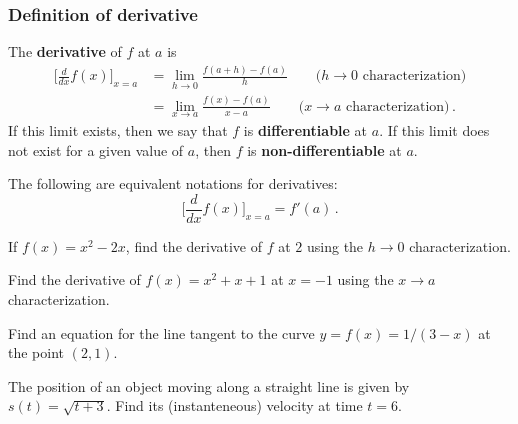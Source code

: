\documentclass[10pt,t,presentation,ignorenonframetext,aspectratio=169]{beamer}
\begin{document}
\begin{frame}
  \frametitle{Definition of derivative}
  \begin{defn}
    The \textbf{derivative} of $f$ at $a$ is
    \begin{align*}
      \biggl[ \frac{d}{dx} f(x) \biggr]_{x=a}
      & = \lim_{h\to 0} \frac{f(a+h) - f(a)}{h}
        \qquad \text{($h \to 0$ characterization)} \\
      & = \lim_{x \to a} \frac{f(x)-f(a)}{x-a}
        \qquad \text{($x \to a$ characterization)} \,.
    \end{align*}
    If this limit exists, then we say that $f$ is \textbf{differentiable} at $a$. If this limit does not exist for a given value of $a$, then $f$ is \textbf{non-differentiable} at $a$.
  \end{defn}

  \begin{notn}
    The following are equivalent notations for derivatives:
    \[
      \biggl[ \frac{d}{dx} f(x) \biggr]_{x=a}
      = f'(a) \,.
    \]
  \end{notn}
\end{frame}

\begin{frame}
  \vs
  \begin{example}
    If $f(x) = x^2 - 2x$, find the derivative of $f$ at $2$ using the $h \to 0$ characterization.
  \end{example}
\end{frame}

\begin{frame}
  \vs
  \begin{example}
    Find the derivative of $f(x) = x^2+x+1$ at $x=-1$ using the $x \to a$ characterization.
  \end{example}
\end{frame}

\begin{frame}
  \vs
  \begin{example}
    Find an equation for the line tangent to the curve $y = f(x) = 1/(3-x)$ at the point $(2,1)$.
  \end{example}
\end{frame}

\begin{frame}
  \vs
  \begin{example}
    The position of an object moving along a straight line is given by $s(t) = \sqrt{t+3}$. Find its (instanteneous) velocity at time $t = 6$.
  \end{example}
\end{frame}
\end{document}
